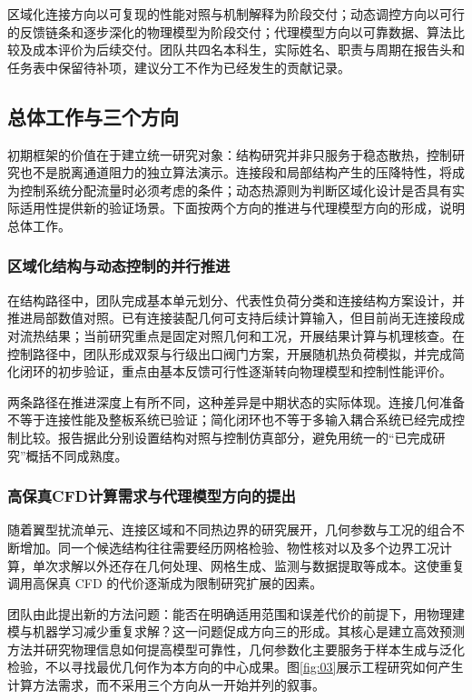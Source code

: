 \documentclass[UTF8]{midterm}
\begin{document}
区域化连接方向以可复现的性能对照与机制解释为阶段交付；动态调控方向以可行的反馈链条和逐步深化的物理模型为阶段交付；代理模型方向以可靠数据、算法比较及成本评价为后续交付。团队共四名本科生，实际姓名、职责与周期在报告头和任务表中保留待补项，建议分工不作为已经发生的贡献记录。
\subsection{总体工作与三个方向}
\label{ch:evolution}
初期框架的价值在于建立统一研究对象：结构研究并非只服务于稳态散热，控制研究也不是脱离通道阻力的独立算法演示。连接段和局部结构产生的压降特性，将成为控制系统分配流量时必须考虑的条件；动态热源则为判断区域化设计是否具有实际适用性提供新的验证场景。下面按两个方向的推进与代理模型方向的形成，说明总体工作。

\subsubsection{区域化结构与动态控制的并行推进}
在结构路径中，团队完成基本单元划分、代表性负荷分类和连接结构方案设计，并推进局部数值对照。已有连接装配几何可支持后续计算输入，但目前尚无连接段成对流热结果；当前研究重点是固定对照几何和工况，开展结果计算与机理核查。在控制路径中，团队形成双泵与行级出口阀门方案，开展随机热负荷模拟，并完成简化闭环的初步验证，重点由基本反馈可行性逐渐转向物理模型和控制性能评价。

两条路径在推进深度上有所不同，这种差异是中期状态的实际体现。连接几何准备不等于连接性能及整板系统已验证；简化闭环也不等于多输入耦合系统已经完成控制比较。报告据此分别设置结构对照与控制仿真部分，避免用统一的“已完成研究”概括不同成熟度。

\subsubsection{高保真CFD计算需求与代理模型方向的提出}
随着翼型扰流单元、连接区域和不同热边界的研究展开，几何参数与工况的组合不断增加。同一个候选结构往往需要经历网格检验、物性核对以及多个边界工况计算，单次求解以外还存在几何处理、网格生成、监测与数据提取等成本。这使重复调用高保真 CFD 的代价逐渐成为限制研究扩展的因素。

团队由此提出新的方法问题：能否在明确适用范围和误差代价的前提下，用物理建模与机器学习减少重复求解？这一问题促成方向三的形成。其核心是建立高效预测方法并研究物理信息如何提高模型可靠性，几何参数化主要服务于样本生成与泛化检验，不以寻找最优几何作为本方向的中心成果。图\ref{fig:03}展示工程研究如何产生计算方法需求，而不采用三个方向从一开始并列的叙事。
\end{document}
